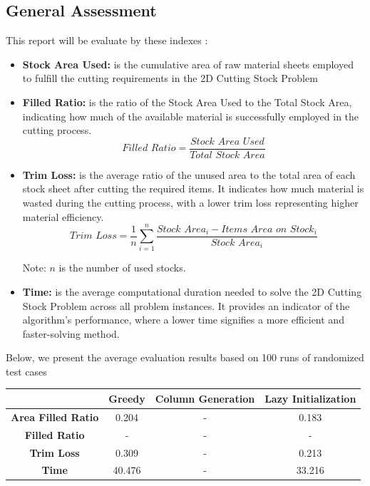 \documentclass[a4paper]{article}
\begin{document}
\subsection{General Assessment}
This report will be evaluate by these indexes : 
\begin{itemize}
    \item \textbf{Stock Area Used: } is the cumulative area of raw material sheets employed to fulfill the cutting requirements in the 2D Cutting Stock Problem
    \item \textbf{Filled Ratio:}  is the ratio of the Stock Area Used to the Total Stock Area, indicating how much of the available material is successfully employed in the cutting process.
     \[
    \textit{Filled Ratio} = \frac{\textit{Stock Area Used}}{\textit{Total Stock Area}}
    \]
    \item \textbf{Trim Loss:} is the average ratio of the unused area to the total area of each stock sheet after cutting the required items. It indicates how much material is wasted during the cutting process, with a lower trim loss representing higher material efficiency.
    \[
    \textit{Trim Loss} = \frac{1}{n} \sum_{i=1}^{n} \frac{\textit{Stock Area}_i - \textit{Items Area on Stock}_i}{\textit{Stock Area}_i}
    \]
    \begin{flushright}
        \centering
        \footnotesize{Note: \( n \) is the number of used stocks.}
    \end{flushright}
\item \textbf{Time:} is the average computational duration needed to solve the 2D Cutting Stock Problem across all problem instances. It provides an indicator of the algorithm’s performance, where a lower time signifies a more efficient and faster-solving method.
\end{itemize}
Below, we present the average evaluation results based on 100 runs of randomized test cases

 \begin{table}[H]
        \centering
        \begin{tabular}{|c|c|c|c|}
            \hline
            \textbf{} & \textbf{Greedy} & \textbf{Column Generation} & \textbf{Lazy Initialization} \\ \hline
            \textbf{Area Filled Ratio} & 0.204 & - & 0.183 \\ \hline
            \textbf{Filled Ratio} & - & - & - \\ \hline
            \textbf{Trim Loss}  & 0.309 & - & 0.213 \\ \hline
            \textbf{Time} & 40.476 & - & 33.216 \\ \hline
        \end{tabular}
\end{table}
\FloatBarrier
\end{document}
